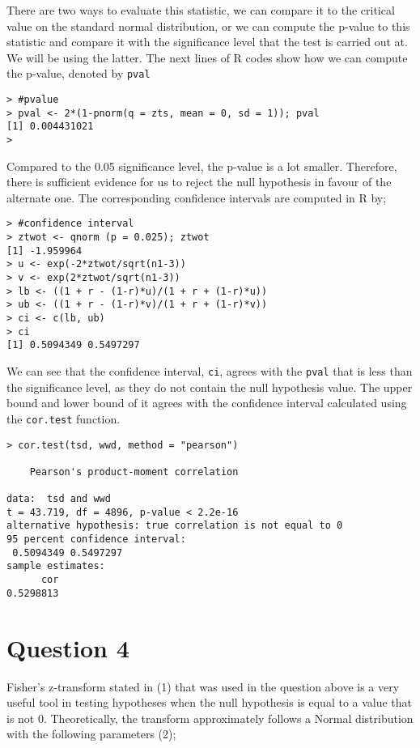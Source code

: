 \documentclass[11pt,a4]{article}
\begin{document}
There are two ways to evaluate this statistic, we can compare it to the critical value on the standard normal distribution, or we can compute the p-value to this statistic and compare it with the significance level that the test is carried out at. We will be using the latter. The next lines of R codes show how we can compute the p-value, denoted by \verb|pval|

\begin{verbatim}
> #pvalue
> pval <- 2*(1-pnorm(q = zts, mean = 0, sd = 1)); pval
[1] 0.004431021
> 
\end{verbatim}

Compared to the 0.05 significance level, the p-value is a lot smaller. Therefore, there is sufficient evidence for us to reject the null hypothesis in favour of the alternate one. The corresponding confidence intervals are computed in R by;

\begin{verbatim}
> #confidence interval
> ztwot <- qnorm (p = 0.025); ztwot
[1] -1.959964
> u <- exp(-2*ztwot/sqrt(n1-3))
> v <- exp(2*ztwot/sqrt(n1-3))
> lb <- ((1 + r - (1-r)*u)/(1 + r + (1-r)*u))
> ub <- ((1 + r - (1-r)*v)/(1 + r + (1-r)*v))
> ci <- c(lb, ub)
> ci
[1] 0.5094349 0.5497297
\end{verbatim}

We can see that the confidence interval, \verb|ci|, agrees with the \verb|pval| that is less than the significance level, as they do not contain the null hypothesis value. The upper bound and lower bound of it agrees with the confidence interval calculated using the \verb|cor.test| function.

\begin{verbatim}
> cor.test(tsd, wwd, method = "pearson")

	Pearson's product-moment correlation

data:  tsd and wwd
t = 43.719, df = 4896, p-value < 2.2e-16
alternative hypothesis: true correlation is not equal to 0
95 percent confidence interval:
 0.5094349 0.5497297
sample estimates:
      cor 
0.5298813 
\end{verbatim}

\section{Question 4}
Fisher’s z-transform stated in (1) that was used in the question above is a very useful tool in testing hypotheses when the null hypothesis is equal to a value that is not 0. Theoretically, the transform approximately follows a Normal distribution with the following parameters (2);
\end{document}
